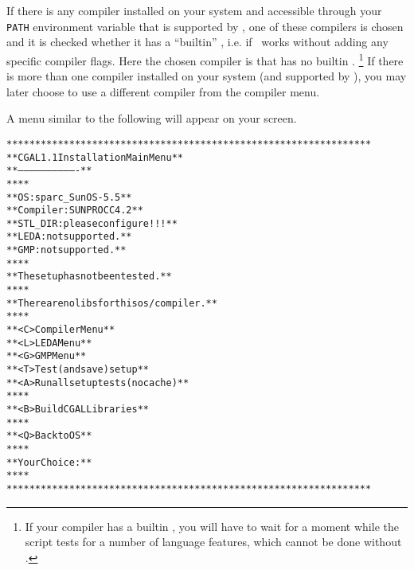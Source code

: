 If there is any compiler installed on your system and accessible
through your \texttt{PATH} environment variable that is supported by
\cgal, one of these compilers is chosen and it is checked whether it
has a ``builtin'' \stl, i.e. if \stl\ works without adding any
specific compiler flags.  Here the chosen compiler is 
that has no builtin \stl.  \footnote{If your compiler has a builtin
  \stl, you will have to wait for a moment while the script tests for
  a number of language features, which cannot be done without \stl.}
If there is more than one compiler installed on your system (and
supported by \cgal), you may later choose to use a different compiler
from the compiler menu.

A menu similar to the following will appear on your screen.

{\scriptsize \label{pic:main-menu}
\begin{alltt}
  ****************************************************************
  **              CGAL 1.1 Installation Main Menu               **
  **              -------------------------------               **
  **                                                            **
  **   OS:                  sparc_SunOS-5.5                     **
  **   Compiler:            SUNPRO CC 4.2                       **
  **   STL_DIR:             please configure!!!                 **
  **   LEDA:                not supported.                      **
  **   GMP:                 not supported.                      **
  **                                                            **
  **   The setup has not been tested.                           **
  **                                                            **
  **   There are no libs for this os/compiler.                  **
  **                                                            **
  **   <C>  Compiler Menu                                       **
  **   <L>  LEDA Menu                                           **
  **   <G>  GMP Menu                                            **
  **   <T>  Test (and save) setup                               **
  **   <A>  Run all setup tests (no cache)                      **
  **                                                            **
  **   <B>  Build CGAL Libraries                                **
  **                                                            **
  **   <Q>  Back to OS                                          **
  **                                                            **
  **   Your Choice:                                             **
  **                                                            **
  ****************************************************************
\end{alltt}}

